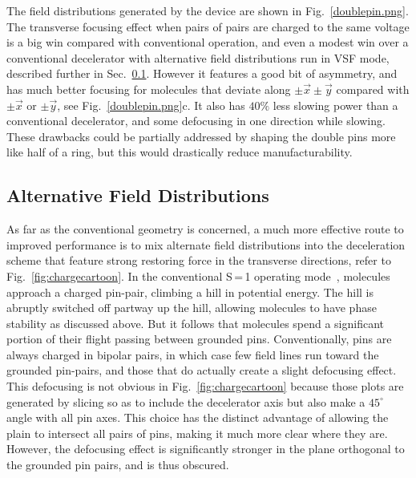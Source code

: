 The field distributions generated by the device are shown in Fig.~\ref{doublepin.png}.
The transverse focusing effect when pairs of pairs are charged to the same voltage is a big win compared with conventional operation, and even a modest win over a conventional decelerator with alternative field distributions run in VSF mode, described further in Sec.~\ref{sec:afd}.
However it features a good bit of asymmetry, and has much better focusing for molecules that deviate along $\pm\vec{x}\pm\vec{y}$ compared with $\pm\vec{x}$ or $\pm\vec{y}$, see Fig.~\ref{doublepin.png}c.
It also has $40\%$ less slowing power than a conventional decelerator, and some defocusing in one direction while slowing.
These drawbacks could be partially addressed by shaping the double pins more like half of a ring, but this would drastically reduce manufacturability.

\subsection{Alternative Field Distributions}\label{sec:afd}

As far as the conventional geometry is concerned, a much more effective route to improved performance is to mix alternate field distributions into the deceleration scheme that feature strong restoring force in the transverse directions, refer to Fig.~\ref{fig:chargecartoon}.
In the conventional S\,=\,1 operating mode~\cite{VanDeMeerakker2012}, molecules approach a charged pin-pair, climbing a hill in potential energy. 
The hill is abruptly switched off partway up the hill, allowing molecules to have phase stability as discussed above.
But it follows that molecules spend a significant portion of their flight passing between grounded pins.
Conventionally, pins are always charged in bipolar pairs, in which case few field lines run toward the grounded pin-pairs, and those that do actually create a slight defocusing effect.
This defocusing is not obvious in Fig.~\ref{fig:chargecartoon} because those plots are generated by slicing so as to include the decelerator axis but also make a $45^\circ$ angle with all pin axes.
This choice has the distinct advantage of allowing the plain to intersect all pairs of pins, making it much more clear where they are.
However, the defocusing effect is significantly stronger in the plane orthogonal to the grounded pin pairs, and is thus obscured.

